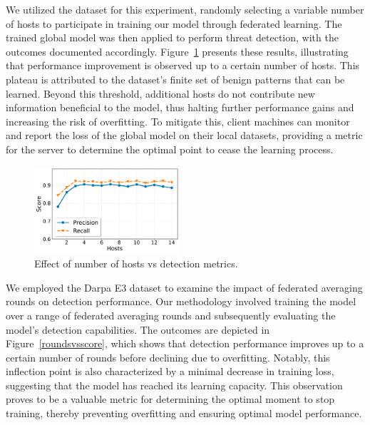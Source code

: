  We utilized the \optc dataset for this experiment, randomly selecting a variable number of hosts to participate in training our model through federated learning. The trained global model was then applied to perform threat detection, with the outcomes documented accordingly. Figure~\ref{scoresvshosts} presents these results, illustrating that performance improvement is observed up to a certain number of hosts. This plateau is attributed to the \optc dataset's finite set of benign patterns that can be learned. Beyond this threshold, additional hosts do not contribute new information beneficial to the model, thus halting further performance gains and increasing the risk of overfitting. To mitigate this, client machines can monitor and report the loss of the global model on their local datasets, providing a metric for the server to determine the optimal point to cease the learning process. \\

\begin{figure}[t!]
  \centering
  \includegraphics[width=0.48\textwidth]{fig/scoresvshosts.pdf}
  \caption{Effect of number of hosts vs detection metrics.}
  \label{scoresvshosts}
  \vspace{-2ex}
\end{figure}

 We employed the Darpa E3 dataset to examine the impact of federated averaging rounds on detection performance. Our methodology involved training the model over a range of federated averaging rounds and subsequently evaluating the model's detection capabilities. The outcomes are depicted in Figure~\ref{roundsvsscore}, which shows that detection performance improves up to a certain number of rounds before declining due to overfitting. Notably, this inflection point is also characterized by a minimal decrease in training loss, suggesting that the model has reached its learning capacity. This observation proves to be a valuable metric for determining the optimal moment to stop training, thereby preventing overfitting and ensuring optimal model performance.

